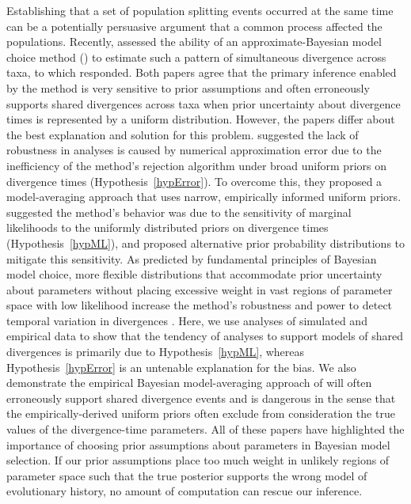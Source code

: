 Establishing that a set of population splitting events occurred at the same
time can be a potentially persuasive argument that a common process affected
the populations.
Recently, \citet{Oaks2012} assessed the ability of an approximate-Bayesian
model choice method (\msb) to estimate such a pattern of simultaneous
divergence across taxa, to which \citet{Hickerson2013} responded.
Both papers agree that the primary inference enabled by the method is very
sensitive to prior assumptions and often erroneously supports shared
divergences across taxa when prior uncertainty about divergence times
is represented by a uniform distribution.
However, the papers differ about the best explanation and solution for this
problem.
\citet{Hickerson2013} suggested the lack of robustness in \msb analyses is
caused by numerical approximation error due to the inefficiency of the method's
rejection algorithm under broad uniform priors on divergence times
(Hypothesis~\ref{hypError}).
To overcome this, they proposed a model-averaging approach that uses narrow,
empirically informed uniform priors.
\citet{Oaks2012} suggested the method's behavior was due to the sensitivity of
marginal likelihoods to the uniformly distributed priors on divergence times
(Hypothesis~\ref{hypML}), and proposed alternative prior probability
distributions to mitigate this sensitivity.
As predicted by fundamental principles of Bayesian model choice, more flexible
distributions that accommodate prior uncertainty about parameters without
placing excessive weight in vast regions of parameter space with low
likelihood increase the method's robustness and power to detect temporal
variation in divergences \citep{Oaks2014dpp}.
Here, we use analyses of simulated and empirical data to show that the tendency
of \msb analyses to support models of shared divergences is primarily due to
Hypothesis~\ref{hypML}, whereas Hypothesis~\ref{hypError} is an untenable
explanation for the bias.
We also demonstrate the empirical Bayesian model-averaging approach of
\citet{Hickerson2013} will often erroneously support shared divergence events
and is dangerous in the sense that the empirically-derived uniform priors often
exclude from consideration the true values of the divergence-time parameters.
All of these papers have highlighted the importance of choosing prior
assumptions about parameters in Bayesian model selection.
If our prior assumptions place too much weight in unlikely regions of parameter
space such that the true posterior supports the wrong model of evolutionary
history, no amount of computation can rescue our inference. 
